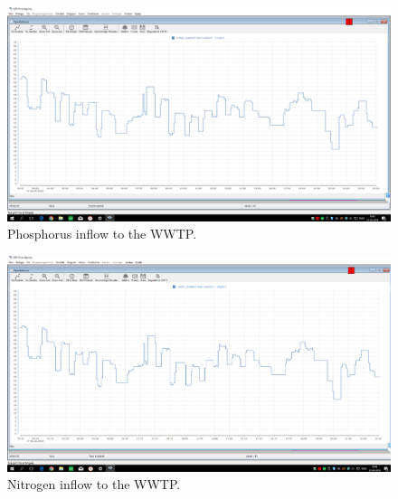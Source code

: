 \begin{figure}[H]
	\centering
	\includegraphics[width=0.95\textheight, angle=-90]{report/appendix/figures/Forfos_data.png}
	\caption{Phosphorus inflow to the WWTP.}
	\label{fig:Forfos_data}
\end{figure}

\begin{figure}[H]
	\centering
	\includegraphics[width=0.95\textheight, angle=-90]{report/appendix/figures/kvaelstof_data.png}
	\caption{Nitrogen inflow to the WWTP.}
	\label{fig:kvaelstof_data}
\end{figure}